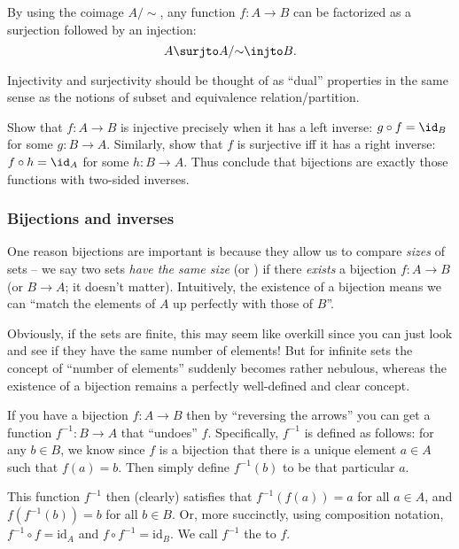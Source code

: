 \begin{remark}
By using the coimage $A/{\sim}$, any function $f : A \to B$ can be factorized as a surjection followed by an injection:
\[ A \surjto A/{\sim} \injto B. \]
\end{remark}

Injectivity and surjectivity should be thought of as ``dual'' properties in the same sense as the notions of subset and equivalence relation/partition.

\begin{exercise}
Show that $f : A \to B$ is injective precisely when it has a left inverse: $g \circ f = \id_B$ for some $g : B \to A$. Similarly, show that $f$ is surjective iff it has a right inverse: $f \circ h = \id_A$ for some $h : B \to A$. Thus conclude that bijections are exactly those functions with two-sided inverses.
\end{exercise}

\subsubsection{Bijections and inverses}

\begin{remark}
One reason bijections are important is because they allow us to compare \emph{sizes} of sets -- we say two sets \emph{have the same size} (or ) if there \emph{exists} a bijection $f : A \to B$ (or $B \to A$; it doesn't matter). Intuitively, the existence of a bijection means we can ``match the elements of $A$ up perfectly with those of $B$''.

Obviously, if the sets are finite, this may seem like overkill since you can just look and see if they have the same number of elements! But for infinite sets the concept of ``number of elements'' suddenly becomes rather nebulous, whereas the existence of a bijection remains a perfectly well-defined and clear concept.
\end{remark}

\begin{definition}
If you have a bijection $f : A \to B$ then by ``reversing the arrows'' you can get a function $f^{-1} : B \to A$ that ``undoes'' $f$. Specifically, $f^{-1}$ is defined as follows: for any $b \in B$, we know since $f$ is a bijection that there is a unique element $a \in A$ such that $f(a)=b$. Then simply define $f^{-1}(b)$ to be that particular $a$.

This function $f^{-1}$ then (clearly) satisfies that $f^{-1}(f(a)) = a$ for all $a \in A$, and $f(f^{-1}(b)) = b$ for all $b \in B$. Or, more succinctly, using composition notation, $f^{-1} \circ f = \mathrm{id}_A$ and $f \circ f^{-1} = \mathrm{id}_B$. We call $f^{-1}$ the  to $f$.
\end{definition}

